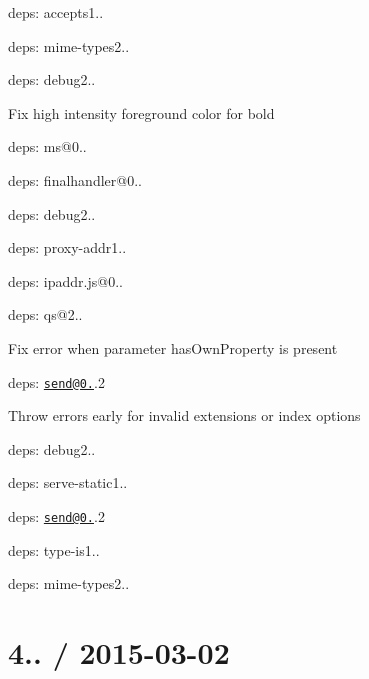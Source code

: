 {\ttfamily 
\begin{DoxyItemize}
\item deps\+: accepts1..
\begin{DoxyItemize}
\item deps\+: mime-\/types2..
\end{DoxyItemize}
\item deps\+: debug2..
\begin{DoxyItemize}
\item Fix high intensity foreground color for bold
\item deps\+: ms@0..
\end{DoxyItemize}
\item deps\+: finalhandler@0..
\begin{DoxyItemize}
\item deps\+: debug2..
\end{DoxyItemize}
\item deps\+: proxy-\/addr1..
\begin{DoxyItemize}
\item deps\+: ipaddr.\+js@0..
\end{DoxyItemize}
\item deps\+: qs@2..
\begin{DoxyItemize}
\item Fix error when parameter {\ttfamily has\+Own\+Property} is present
\end{DoxyItemize}
\item deps\+: \href{mailto:send@0.12}{\tt send@0.}.2
\begin{DoxyItemize}
\item Throw errors early for invalid {\ttfamily extensions} or {\ttfamily index} options
\item deps\+: debug2..
\end{DoxyItemize}
\item deps\+: serve-\/static1..
\begin{DoxyItemize}
\item deps\+: \href{mailto:send@0.12}{\tt send@0.}.2
\end{DoxyItemize}
\item deps\+: type-\/is1..
\begin{DoxyItemize}
\item deps\+: mime-\/types2..
\end{DoxyItemize}
\end{DoxyItemize}}

{\ttfamily \section*{4.. / 2015-\/03-\/02 }}

